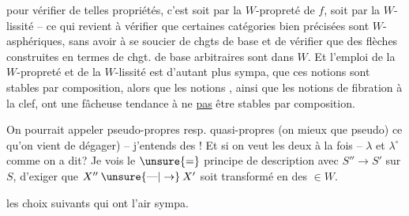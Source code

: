 
pour vérifier de telles propriétés, c'est soit par la $W$-propreté de $f$, soit par la $W$-lissité -- ce qui revient à vérifier que certaines catégories bien précisées sont $W$-asphériques, sans avoir à se soucier de chgts de base et de vérifier que des flèches construites en termes de chgt. de base arbitraires sont dans $W$. Et l'emploi de la $W$-propreté et de la $W$-lissité est d'autant plus sympa, que ces notions sont stables par composition, alors que  les notions , ainsi que les notions de fibration à la clef, ont une fâcheuse tendance à ne \uline{pas} être stables par composition.

On pourrait appeler pseudo-propres resp. quasi-propres (on  mieux que pseudo) ce qu'on vient de dégager) -- j'entends des ! Et si on veut les deux à la fois -- $\lambda$ et $\lambda^\circ$  comme on a dit? Je vois le $\unsure{=}$ principe de description avec  $S''\to S'$ sur $S$, d'exiger que $X''\mathbin{\unsure{\text{---}|\to}}X'$ soit transformé en des $\in W$.

 les choix suivants qui ont l'air sympa.


